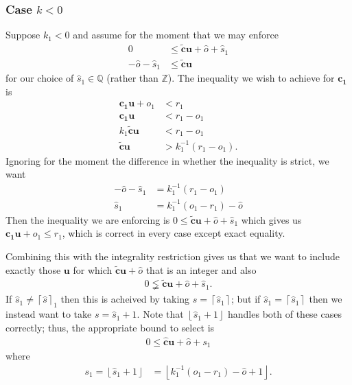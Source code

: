 \documentclass[11pt]{article}
\newcommand{\vect}[1]{\mathbf{#1}}
\newcommand{\floor}[1]{{\left\lfloor{#1}\right\rfloor}}
\newcommand{\ceil}[1]{{\left\lceil{#1}\right\rceil}}
\begin{document}
\subsubsection{Case $k < 0$}

Suppose $k_1 < 0$ and assume for the moment that we may enforce
\begin{align*}
0 &\leq \widetilde{\vect{c}}\vect{u} + \widehat{o} + \widehat{s}_1 \\
-\widehat{o} - \widehat{s}_1 &\leq \widetilde{\vect{c}}\vect{u}
\end{align*}
for our choice of $\widehat{s}_1\in\mathbb{Q}$ (rather than $\mathbb{Z}$). The inequality we wish to achieve for $\vect{c_1}$ is
\begin{align*}
\vect{c_1}\vect{u} + o_1 &< r_1 \\
\vect{c_1}\vect{u} &< r_1 - o_1 \\
k_1\widetilde{\vect{c}}\vect{u} &< r_1 - o_1 \\
\widetilde{\vect{c}}\vect{u} &> k_1^{-1}(r_1 - o_1).
\end{align*}
Ignoring for the moment the difference in whether the inequality is strict, we want
\begin{align*}
-\widehat{o}-\widehat{s}_1 &= k_1^{-1}(r_1 - o_1) \\
\widehat{s}_1 &= k_1^{-1}(o_1 - r_1) - \widehat{o}
\end{align*}
Then the inequality we are enforcing is $0 \leq \widetilde{\vect{c}}\vect{u} + \widehat{o} + \widehat{s}_1$ which gives us $\vect{c_1}\vect{u} + o_1 \leq r_1$, which is correct in every case except exact equality.

Combining this with the integrality restriction gives us that we want to include exactly those $\vect{u}$ for which $\widetilde{\vect{c}}\vect{u} + \widehat{o}$ that is an integer and also
\begin{align*}
0 \lneqq \widetilde{\vect{c}}\vect{u} + \widehat{o} + \widehat{s}_1.
\end{align*}
If $\widehat{s}_1 \neq \ceil{\widehat{s}}_1$ then this is acheived by taking $s = \ceil{\widehat{s}_1}$; but if $\widehat{s}_1 = \ceil{\widehat{s}_1}$ then we instead want to take $s = \widehat{s}_1 + 1$. Note that $\floor{\widehat{s}_1 + 1}$ handles both of these cases correctly; thus, the appropriate bound to select is
\begin{align*}
0 \leq \widehat{\vect{c}}\vect{u} + \widehat{o} + s_1
\end{align*}
where
\begin{align}
s_1 = \floor{\widehat{s}_1 + 1} &= \floor{k_1^{-1}(o_1 - r_1) - \widehat{o} + 1}. \label{s1k-}
\end{align}
\end{document}
